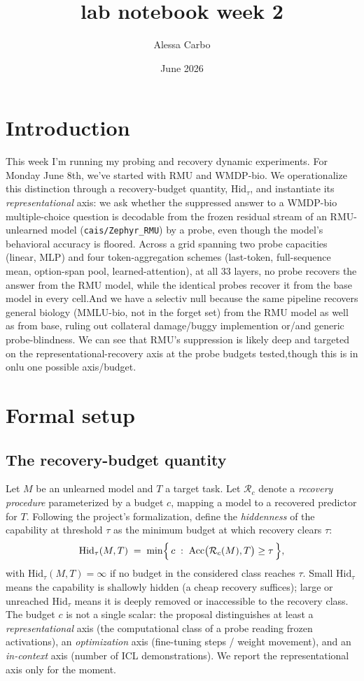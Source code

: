 \documentclass[11pt]{article}
\title{lab notebook week 2}
\author{Alessa Carbo}
\date{June 2026}
\newcommand{\Hid}{\mathrm{Hid}}
\newcommand{\Acc}{\mathrm{Acc}}
\newcommand{\Rc}{\mathcal{R}}
\begin{document}
\maketitle

\section{Introduction}
This week I'm running my probing and recovery dynamic experiments. For Monday June 8th, we've started with RMU and WMDP-bio.  We operationalize this
distinction through a recovery-budget quantity, $\Hid_\tau$, and instantiate its
\emph{representational} axis: we ask whether the suppressed answer to a WMDP-bio
multiple-choice question is decodable from the frozen residual stream of an RMU-unlearned
model (\texttt{cais/Zephyr\_RMU}) by a probe, even though the model's behavioral accuracy
is floored. Across a grid spanning two probe capacities (linear, MLP) and four
token-aggregation schemes (last-token, full-sequence mean, option-span pool,
learned-attention), at all 33 layers, no probe recovers the answer from the RMU model,
while the identical probes recover it from the base model in every cell.And we have a selectiv null because the same pipeline recovers general biology (MMLU-bio, not in the forget set)
from the RMU model as well as from base, ruling out collateral damage/buggy implemention or/and generic
probe-blindness. We can see that RMU's suppression is likely deep and targeted on the
representational-recovery axis at the probe budgets tested,though this is in onlu one possible axis/budget.


\section{Formal setup}
 
\subsection{The recovery-budget quantity}
Let $M$ be an unlearned model and $T$ a target task. Let $\Rc_c$ denote a
\emph{recovery procedure} parameterized by a budget $c$, mapping a model to a recovered
predictor for $T$. Following the project's formalization, define the \emph{hiddenness} of
the capability at threshold $\tau$ as the minimum budget at which recovery clears $\tau$:
\begin{equation}
\Hid_\tau(M, T) \;=\; \min\Bigl\{\, c \;:\; \Acc\bigl(\Rc_c(M), T\bigr) \ge \tau \,\Bigr\},
\label{eq:hid}
\end{equation}
with $\Hid_\tau(M,T) = \infty$ if no budget in the considered class reaches $\tau$.
Small $\Hid_\tau$ means the capability is shallowly hidden (a cheap recovery suffices);
large or unreached $\Hid_\tau$ means it is deeply removed or inaccessible to the recovery
class. The budget $c$ is not a single scalar: the proposal distinguishes at least a
\emph{representational} axis (the computational class of a probe reading frozen
activations), an \emph{optimization} axis (fine-tuning steps / weight movement), and an
\emph{in-context} axis (number of ICL demonstrations). We report the representational axis only for the moment.
\end{document}
